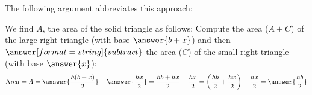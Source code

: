\documentclass[nooutcomes,space,handout]{ximera}
\begin{document}
\begin{problem}
\begin{problem}
\end{problem}

\begin{problem}
The following argument abbreviates this approach:
\begin{image}
\end{image}

We find $A$, the area of the solid triangle as follows: Compute the area ($A+C$) of the large right triangle (with base $\answer{b+x}$) and then 
$\answer[format=string]{subtract}$ the area ($C$) of the small right triangle (with base $\answer{x}$): 
\[
\mathrm{Area} = A =  \answer{\frac{h(b+x)}{2}} - \answer{\frac{hx}{2}}= \frac{hb+hx}{2} - \frac{hx}{2}
= \left(\frac{hb}{2} + \frac{hx}{2}\right) - \frac{hx}{2} = \answer{\frac{hb}{2}}
\]
\end{problem}
\end{problem}
\end{document}
